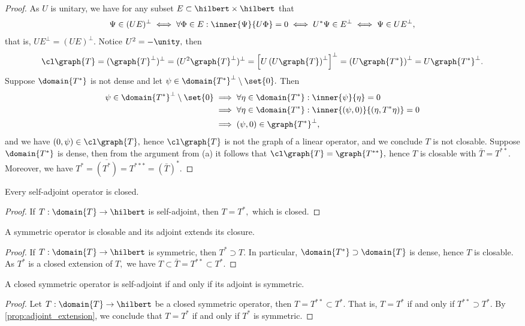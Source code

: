 \begin{proof}
    As \(U\) is unitary, we have for any subset \(E \subset \hilbert \times \hilbert\) that
    \begin{equation*}
        \Psi \in (U E)^\perp \iff \forall \Phi \in E : \inner{\Psi}{U \Phi} = 0 \iff U^*\Psi \in E^\perp \iff \Psi \in U E^\perp,
    \end{equation*}
    that is, \(UE^\perp = (UE)^\perp\). Notice \(U^2 = -\unity,\) then
    \begin{equation*}
        \cl\graph{T} = (\graph{T}^\perp)^\perp = (U^2 \graph{T}^\perp)^{\perp} = \left[U\left(U \graph{T}\right)^\perp\right]^\perp = \left(U \graph{T^*}\right)^\perp = U \graph{T^*}^\perp.
    \end{equation*}
    Suppose \(\domain{T^*}\) is not dense and let \(\psi \in \domain{T^*}^\perp \setminus \set{0}.\) Then
    \begin{align*}
        \psi \in \domain{T^*}^\perp \setminus \set{0} &\implies \forall \eta \in \domain{T^*} : \inner{\psi}{\eta} = 0\\
                                                      &\implies \forall \eta \in \domain{T^*} : \inner{(\psi,0)}{(\eta, T^*\eta)} = 0\\
                                                      &\implies (\psi, 0) \in \graph{T^*}^\perp,
    \end{align*}
    and we have \((0, \psi) \in \cl \graph{T},\) hence \(\cl\graph{T}\) is not the graph of a linear operator, and we conclude \(T\) is not closable. Suppose \(\domain{T^*}\) is dense, then from the argument from (a) it follows that \(\cl\graph{T} = \graph{T^{**}},\) hence \(T\) is closable with \(\bar{T} = T^{**}.\) Moreover, we have \(T^* = \overline{(T^*)} = T^{***} = (\bar{T})^*.\)
\end{proof}
\begin{corollary}
    Every self-adjoint operator is closed.
\end{corollary}
\begin{proof}
    If \(T : \domain{T} \to \hilbert\) is self-adjoint, then \(T = T^*,\) which is closed.
\end{proof}
\begin{corollary}
    A symmetric operator is closable and its adjoint extends its closure.
\end{corollary}
\begin{proof}
    If \(T : \domain{T} \to \hilbert\) is symmetric, then \(T^* \supset T.\) In particular, \(\domain{T^*}\supset\domain{T}\) is dense, hence \(T\) is closable. As \(T^*\) is a closed extension of \(T,\) we have \(T \subset \bar{T} = T^{**} \subset T^*.\)
\end{proof}
\begin{corollary}
    A closed symmetric operator is self-adjoint if and only if its adjoint is symmetric.
\end{corollary}
\begin{proof}
    Let \(T : \domain{T} \to \hilbert\) be a closed symmetric operator, then \(T = T^{**} \subset T^*\). That is, \(T = T^*\) if and only if \(T^{**} \supset T^*.\) By \cref{prop:adjoint_extension}, we conclude that \(T = T^*\) if and only if \(T^*\) is symmetric.
\end{proof}

